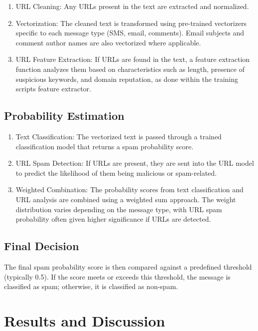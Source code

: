 \documentclass{article}
\begin{document}
\begin{enumerate}
    \item URL Cleaning: Any URLs present in the text are extracted and normalized.
    \item Vectorization: The cleaned text is transformed using pre-trained vectorizers specific to each message type (SMS, email, comments). Email subjects and comment author names are also vectorized where applicable.
    \item URL Feature Extraction: If URLs are found in the text, a feature extraction function analyzes them based on characteristics such as length, presence of suspicious keywords, and domain reputation, as done within the training scripts feature extractor.
\end{enumerate}

\subsection{Probability Estimation}

\begin{enumerate}
    \item Text Classification: The vectorized text is passed through a trained classification model that returns a spam probability score.
    \item URL Spam Detection: If URLs are present, they are sent into the URL model to predict the likelihood of them being malicious or spam-related.
    \item Weighted Combination: The probability scores from text classification and URL analysis are combined using a weighted sum approach. The weight distribution varies depending on the message type, with URL spam probability often given higher significance if URLs are detected.
\end{enumerate}

\subsection{Final Decision}

The final spam probability score is then compared against a predefined threshold (typically 0.5). If the score meets or exceeds this threshold, the message is classified as spam; otherwise, it is classified as non-spam.

\section{Results and Discussion}
\end{document}
